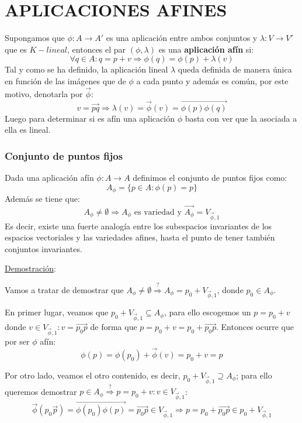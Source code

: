 \documentclass[10pt,a4paper,openright]{book}
\begin{document}
\section*{APLICACIONES AFINES}
Supongamos que $\phi: A\rightarrow A'$ es una aplicación entre ambos conjuntos y $\lambda: V\rightarrow V'$ que es $K-lineal$, entonces el par $(\phi,\lambda)$ es una \textbf{aplicación afín} si:
$$\forall q \in A: q = p+v\Rightarrow \phi(q) = \phi(p)+\lambda(v)$$
Tal y como se ha definido, la aplicación lineal $\lambda$ queda definida de manera única en función de las imágenes que de $\phi$ a cada punto y además es común, por este motivo, denotarla por $\vec{\phi}$:
$$v=\vec{pq}\Rightarrow \lambda (v) = \vec{\phi}(v) = \overrightarrow{\phi(p)\phi(q)}$$
Luego para determinar si es afín una aplicación $\phi$ basta con ver que la asociada a ella es lineal.

\subsubsection*{Conjunto de puntos fijos}
Dada una aplicación afín $\phi: A\rightarrow A$ definimos el conjunto de puntos fijos como:
$$A_\phi = \{p\in A: \phi(p) = p\}$$
Además se tiene que:
$$A_\phi \neq \emptyset \Rightarrow A_\phi \mbox{ es variedad y } \overrightarrow{A_\phi} = V_{\vec{\phi}, 1}$$
Es decir, existe una fuerte analogía entre los subespacios invariantes de los espacios vectoriales y las variedades afines, hasta el punto de tener también conjuntos invariantes.

\underline{Demostración}:

Vamos a tratar de demostrar que $A_\phi \neq \emptyset \overset{?}{\Rightarrow} A_\phi = p_0 + V_{\vec{\phi}, 1} $, donde $p_0 \in A_\phi$.

En primer lugar, veamos que $p_0 + V_{\vec{\phi}, 1}  \subseteq A_\phi$, para ello escogemos un $p= p_0+v$ donde $v\in V_{\vec{\phi}, 1}:  v = \vec{p_0 p}$ de forma que $p = p_0 + v = p_0 + \vec{p_0 p}$. Entonces ocurre que por ser $\phi$ afín:
$$\phi(p) = \phi(p_0)  + \vec{\phi}(v) = p_0 + v = p$$

Por otro lado, veamos el otro contenido, es decir, $p_0 + V_{\vec{\phi}, 1}  \supseteq A_\phi$; para ello queremos demostrar $p \in A_\phi \overset{?}{\Rightarrow}  p = p_0 + v: v \in  V_{\vec{\phi}, 1}$:
$$\vec{\phi}(p_0 \vec{p}) = \overrightarrow{\phi(p_0) \phi(p)} = \vec{p_0 p}  \in V_{\vec{\phi}, 1} \Rightarrow p = p_0 + \vec{p_0 p} \in p_0 + V_{\vec{\phi}, 1} $$
\end{document}
